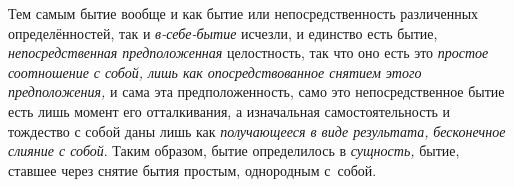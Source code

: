 Тем самым бытие вообще и как бытие или непосредственность различенных
определённостей, так и {\em в-себе-бытие} исчезли, и единство есть бытие,
{\em непосредственная предположенная} целостность, так что оно есть это
{\em простое соотношение с собой, лишь как опосредствованное снятием
этого предположения,} и сама эта предположенность, само это непосредственное
бытие есть лишь момент его отталкивания, а изначальная самостоятельность и
тождество с собой даны лишь как {\em получающееся в виде результата,}
{\em бесконечное слияние с собой}. Таким образом, бытие определилось в
{\em сущность,} бытие, ставшее через снятие бытия простым, однородным с~собой.
